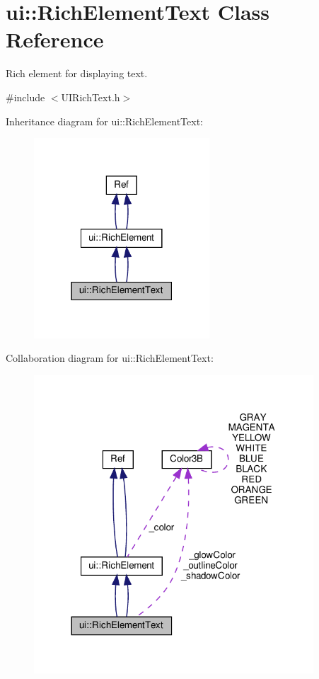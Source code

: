 \hypertarget{classui_1_1RichElementText}{}\section{ui\+:\+:Rich\+Element\+Text Class Reference}
\label{classui_1_1RichElementText}


Rich element for displaying text.  




{\ttfamily \#include $<$U\+I\+Rich\+Text.\+h$>$}



Inheritance diagram for ui\+:\+:Rich\+Element\+Text\+:
\nopagebreak
\begin{figure}[H]
\begin{center}
\leavevmode
\includegraphics[width=186pt]{classui_1_1RichElementText__inherit__graph}
\end{center}
\end{figure}


Collaboration diagram for ui\+:\+:Rich\+Element\+Text\+:
\nopagebreak
\begin{figure}[H]
\begin{center}
\leavevmode
\includegraphics[width=296pt]{classui_1_1RichElementText__coll__graph}
\end{center}
\end{figure}

